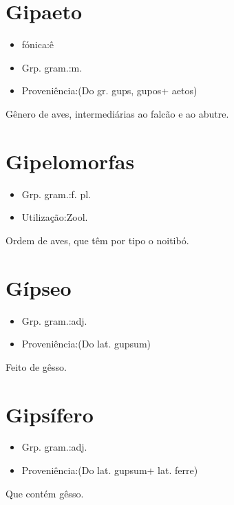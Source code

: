 \section{Gipaeto}
\begin{itemize}
\item {fónica:ê}
\end{itemize}
\begin{itemize}
\item {Grp. gram.:m.}
\end{itemize}
\begin{itemize}
\item {Proveniência:(Do gr. \textunderscore gups\textunderscore , \textunderscore gupos\textunderscore  + \textunderscore aetos\textunderscore )}
\end{itemize}
Gênero de aves, intermediárias ao falcão e ao abutre.
\section{Gipelomorfas}
\begin{itemize}
\item {Grp. gram.:f. pl.}
\end{itemize}
\begin{itemize}
\item {Utilização:Zool.}
\end{itemize}
Ordem de aves, que têm por tipo o noitibó.
\section{Gípseo}
\begin{itemize}
\item {Grp. gram.:adj.}
\end{itemize}
\begin{itemize}
\item {Proveniência:(Do lat. \textunderscore gupsum\textunderscore )}
\end{itemize}
Feito de gêsso.
\section{Gipsífero}
\begin{itemize}
\item {Grp. gram.:adj.}
\end{itemize}
\begin{itemize}
\item {Proveniência:(Do lat. \textunderscore gupsum\textunderscore  + lat. \textunderscore ferre\textunderscore )}
\end{itemize}
Que contém gêsso.
